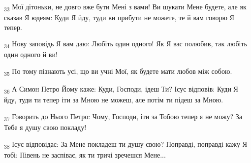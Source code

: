 \begin{tcolorbox}
\textsubscript{33} Мої дітоньки, не довго вже бути Мені з вами! Ви шукати Мене будете, але як сказав Я юдеям: Куди Я йду, туди ви прибути не можете, те й вам говорю Я тепер.
\end{tcolorbox}
\begin{tcolorbox}
\textsubscript{34} Нову заповідь Я вам даю: Любіть один одного! Як Я вас полюбив, так любіть один одного й ви!
\end{tcolorbox}
\begin{tcolorbox}
\textsubscript{35} По тому пізнають усі, що ви учні Мої, як будете мати любов між собою.
\end{tcolorbox}
\begin{tcolorbox}
\textsubscript{36} А Симон Петро Йому каже: Куди, Господи, ідеш Ти? Ісус відповів: Куди Я йду, туди ти тепер іти за Мною не можеш, але потім ти підеш за Мною.
\end{tcolorbox}
\begin{tcolorbox}
\textsubscript{37} Говорить до Нього Петро: Чому, Господи, іти за Тобою тепер я не можу? За Тебе я душу свою покладу!
\end{tcolorbox}
\begin{tcolorbox}
\textsubscript{38} Ісус відповідає: За Мене покладеш ти душу свою? Поправді, поправді кажу Я тобі: Півень не заспіває, як ти тричі зречешся Мене...
\end{tcolorbox}
